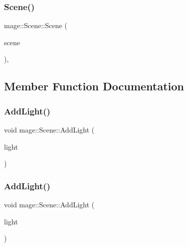 \hypertarget{classmage_1_1_scene_a35b8fc4242c2348e53014b96416fc3d3}{}\label{classmage_1_1_scene_a35b8fc4242c2348e53014b96416fc3d3} 
\subsubsection{\texorpdfstring{Scene()}{Scene()}\hspace{0.1cm}{\footnotesize\ttfamily [3/3]}}
{\footnotesize\ttfamily mage\+::\+Scene\+::\+Scene (\begin{DoxyParamCaption}\item[{\hyperlink{classmage_1_1_scene}{Scene} \&\&}]{scene }\end{DoxyParamCaption})\hspace{0.3cm}{\ttfamily [protected]}, {\ttfamily [default]}}



\subsection{Member Function Documentation}
\hypertarget{classmage_1_1_scene_a6ce8182afe3c1f39249ec08b62aee317}{}\label{classmage_1_1_scene_a6ce8182afe3c1f39249ec08b62aee317} 
\subsubsection{\texorpdfstring{Add\+Light()}{AddLight()}\hspace{0.1cm}{\footnotesize\ttfamily [1/2]}}
{\footnotesize\ttfamily void mage\+::\+Scene\+::\+Add\+Light (\begin{DoxyParamCaption}\item[{\hyperlink{namespacemage_a1e01ae66713838a7a67d30e44c67703e}{Shared\+Ptr}$<$ \hyperlink{namespacemage_a85082c7e15a2bbf19b1753b7de6c45db}{Omni\+Light\+Node} $>$}]{light }\end{DoxyParamCaption})\hspace{0.3cm}{\ttfamily [private]}}

\hypertarget{classmage_1_1_scene_aeeba74ee789d4917ed72b179f16c1222}{}\label{classmage_1_1_scene_aeeba74ee789d4917ed72b179f16c1222} 
\subsubsection{\texorpdfstring{Add\+Light()}{AddLight()}\hspace{0.1cm}{\footnotesize\ttfamily [2/2]}}
{\footnotesize\ttfamily void mage\+::\+Scene\+::\+Add\+Light (\begin{DoxyParamCaption}\item[{\hyperlink{namespacemage_a1e01ae66713838a7a67d30e44c67703e}{Shared\+Ptr}$<$ \hyperlink{namespacemage_a46c8f54b869a5dc07f520c600b9046bd}{Spot\+Light\+Node} $>$}]{light }\end{DoxyParamCaption})\hspace{0.3cm}{\ttfamily [private]}}

